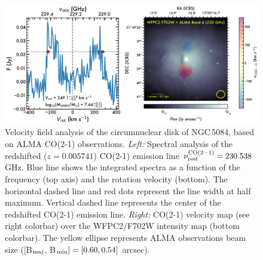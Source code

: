 \documentclass[modern]{CORE-AAS/aastex631}
\begin{document}
\begin{figure}[t!]
\begin{center}
\includegraphics[trim={0 0 0 0}, clip, width=\textwidth]{FIGURES/ALMA_spectra_vfield.png}
\caption{Velocity field analysis of the circumnuclear disk of NGC\,5084, based on ALMA CO(2-1) observations. \emph{Left:} Spectral analysis of the redshifted ($z=0.005741$) CO(2-1) emission line $\nu^{\rm CO(2-1)}_{\rm rest} = 230.538$ GHz. Blue line shows the integrated spectra as a function of the frequency (top axis) and the rotation velocity (bottom). The horizontal dashed line and red dots represent the line width at half maximum. Vertical dashed line represents the center of the redshifted CO(2-1) emission line. \emph{Right:} CO(2-1) velocity map (see right colorbar) over the WFPC2/F702W intensity map (bottom colorbar). The yellow ellipse represents ALMA observations beam size ([B$_{\rm maj}$, B$_{\rm min}]= [0.60,0.54]$ arcsec).} 
\label{fig:ALMA}
\end{center}
\end{figure}
\end{document}
